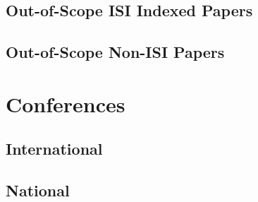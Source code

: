 \subsection{Out-of-Scope ISI Indexed Papers}

\subsection{Out-of-Scope Non-ISI Papers}

\section{Conferences}

\subsection{International}

\subsection{National}